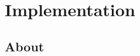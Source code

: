 \chapter{\texorpdfstring{}{FPGA} Implementation}\label{chap:FPGA_Implementation}

\section{About}\label{sec:About}



